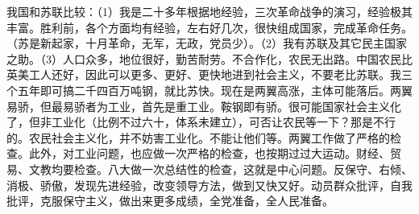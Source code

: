我国和苏联比较：（1）我是二十多年根据地经验，三次革命战争的演习，经验极其丰富。胜利前，各个方面均有经验，左右好几次，很快组成国家，完成革命任务。（苏是新起家，十月革命，无军，无政，党员少）。（2）我有苏联及其它民主国家之助。（3）人口众多，地位很好，勤苦耐劳。不合作化，农民无出路。中国农民比英美工人还好，因此可以更多、更好、更快地进到社会主义，不要老比苏联。我三个五年即可搞二千四百万吨钢，就比苏快。现在是两翼高涨，主体可能落后。两翼易骄，但最易骄者为工业，首先是重工业。鞍钢即有骄。很可能国家社会主义化了，但非工业化（比例不过六十，体系未建立），可否让农民等一下？那是不行的。农民社会主义化，并不妨害工业化。不能让他们等。两翼工作做了严格的检查。此外，对工业问题，也应做一次严格的检查，也按期过过大运动。财经、贸易、文教均要检查。八大做一次总结性的检查，这就是中心问题。反保守、右倾、消极、骄傲，发现先进经验，改变领导方法，做到又快又好。动员群众批评，自我批评，克服保守主义，做出来更多成绩，全党准备，全人民准备。


